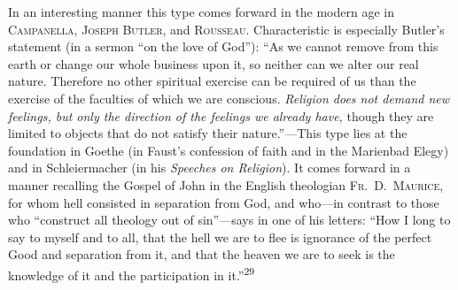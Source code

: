 \documentclass[12pt,a4paper]{book}
\begin{document}
In an interesting manner this type comes forward in the modern age in
\textsc{Campanella}, \textsc{Joseph Butler}, and \textsc{Rousseau}.
Characteristic is especially Butler's statement (in a sermon ``on the love of
God''): ``As we cannot remove from this earth or change our whole business upon
it, so neither can we alter our real nature. Therefore no other spiritual
exercise can be required of us than the exercise of the faculties of which we are
conscious. \emph{Religion does not demand new feelings, but only the direction of
the feelings we already have,} though they are limited to objects that do not
satisfy their nature.''---This type lies at the foundation in Goethe (in Faust's
confession of faith and in the Marienbad Elegy) and in Schleiermacher (in his
\emph{Speeches on Religion}). It comes forward in a manner recalling the Gospel
of John in the English theologian \textsc{Fr.\ D.\ Maurice}, for whom hell
consisted in separation from God, and who---in contrast to those who ``construct
all theology out of sin''---says in one of his letters: ``How I long to say to
myself and to all, that the hell we are to flee is ignorance of the perfect Good
and separation from it, and that the heaven we are to seek is the knowledge of it
and the participation in it.''\textsuperscript{29}

\medskip
\end{document}
